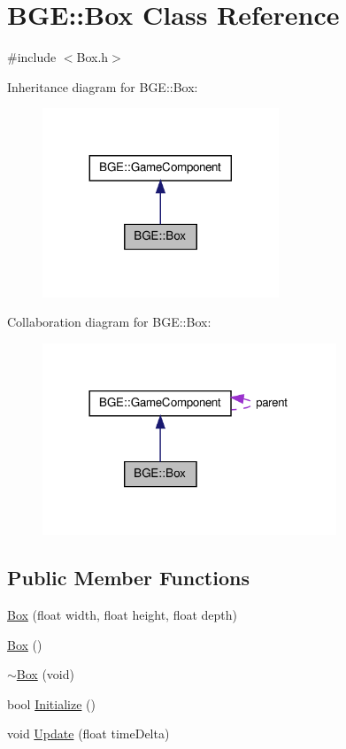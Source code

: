 \hypertarget{class_b_g_e_1_1_box}{\section{B\-G\-E\-:\-:Box Class Reference}
\label{class_b_g_e_1_1_box}
}


{\ttfamily \#include $<$Box.\-h$>$}



Inheritance diagram for B\-G\-E\-:\-:Box\-:
\nopagebreak
\begin{figure}[H]
\begin{center}
\leavevmode
\includegraphics[width=200pt]{class_b_g_e_1_1_box__inherit__graph}
\end{center}
\end{figure}


Collaboration diagram for B\-G\-E\-:\-:Box\-:
\nopagebreak
\begin{figure}[H]
\begin{center}
\leavevmode
\includegraphics[width=249pt]{class_b_g_e_1_1_box__coll__graph}
\end{center}
\end{figure}
\subsection*{Public Member Functions}
\begin{DoxyCompactItemize}
\item 
\hyperlink{class_b_g_e_1_1_box_a3554491d9ea5f22c9094c3aebf9cb7a4}{Box} (float width, float height, float depth)
\item 
\hyperlink{class_b_g_e_1_1_box_a5e13449deb2e663911c5fd394374290d}{Box} ()
\item 
\hyperlink{class_b_g_e_1_1_box_aa896f0e7406d0459a0f953d35d11d403}{$\sim$\-Box} (void)
\item 
bool \hyperlink{class_b_g_e_1_1_box_a3307c07b3646216ced858f53ca1f9cf5}{Initialize} ()
\item 
void \hyperlink{class_b_g_e_1_1_box_acc3f8cdd3607bae6d7f3987ec2361f1b}{Update} (float time\-Delta)
\end{DoxyCompactItemize}
